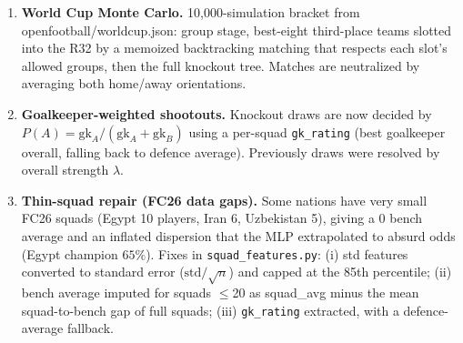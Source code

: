 \documentclass{article}
\begin{document}
\begin{enumerate}
\item \textbf{World Cup Monte Carlo.} 10{,}000-simulation bracket from openfootball/worldcup.json: group stage, best-eight third-place teams slotted into the R32 by a memoized backtracking matching that respects each slot's allowed groups, then the full knockout tree. Matches are neutralized by averaging both home/away orientations.
\item \textbf{Goalkeeper-weighted shootouts.} Knockout draws are now decided by $P(A)=\mathrm{gk}_A/(\mathrm{gk}_A+\mathrm{gk}_B)$ using a per-squad \texttt{gk\_rating} (best goalkeeper overall, falling back to defence average). Previously draws were resolved by overall strength $\lambda$.
\item \textbf{Thin-squad repair (FC26 data gaps).} Some nations have very small FC26 squads (Egypt 10 players, Iran 6, Uzbekistan 5), giving a $0$ bench average and an inflated dispersion that the MLP extrapolated to absurd odds (Egypt champion $65\%$). Fixes in \texttt{squad\_features.py}: (i) std features converted to standard error ($\mathrm{std}/\sqrt{n}$) and capped at the 85th percentile; (ii) bench average imputed for squads $\leq$20 as squad\_avg minus the mean squad-to-bench gap of full squads; (iii) \texttt{gk\_rating} extracted, with a defence-average fallback.
\end{enumerate}
\end{document}

